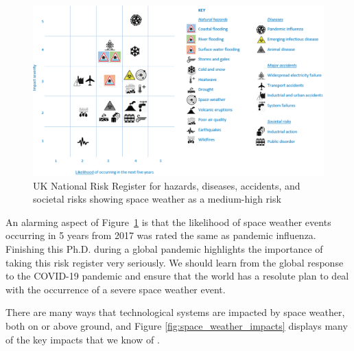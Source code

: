\begin{figure}[ht!]
	\centering
	\includegraphics[width=\columnwidth]{UK_risk_register.eps}
	\caption{UK National Risk Register for hazards, diseases, accidents, and societal risks showing space weather as a medium-high risk \citep{cabinet_office_national_2017}}
	\label{fig:UK_Risk_reg}
\end{figure}

\vspace{1em}

An alarming aspect of Figure~\ref{fig:UK_Risk_reg} is that the likelihood of space weather events occurring in 5 years from 2017 was rated the same as pandemic influenza. Finishing this Ph.D. during a global pandemic highlights the importance of taking this risk register very seriously. We should learn from the global response to the COVID-19 pandemic and ensure that the world has a resolute plan to deal with the occurrence of a severe space weather event.

There are many ways that technological systems are impacted by space weather, both on or above ground, and Figure \ref{fig:space_weather_impacts} displays many of the key impacts that we know of \citep{beggan_ground_2018}. 


